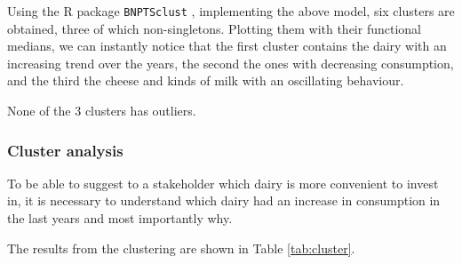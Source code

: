 Using the R package \texttt{BNPTSclust} \cite{Nieto2014Bayesian}, implementing the above model, six clusters are obtained, three of which non-singletons.
Plotting them with their functional medians, we can instantly notice that the first cluster contains the dairy with an increasing trend over the years, the second the ones with decreasing consumption, and the third the cheese and kinds of milk with an oscillating behaviour.


None of the 3 clusters has outliers.



\subsubsection{Cluster analysis}

To be able to suggest to a stakeholder which dairy is more convenient to invest in, it is necessary to understand which dairy had an increase in consumption in the last years and most importantly why.

The results from the clustering are shown in Table \ref{tab:cluster}.

